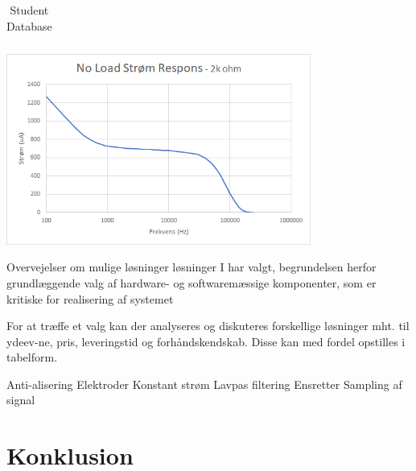 \documentclass[main.tex]{subfiles}
\begin{document}
\begin{table}[H]
\begin{minipage}[b]{0.30\linewidth}
\begin{tabular}{ r |  r }
\end{tabular}
    \caption{Student Database}
    \label{table:student}
\end{minipage}\hfill
\begin{minipage}[b]{0.7\linewidth}
\centering
\includegraphics[width=10cm]{Figure/stromfrekvensoprindelig2k}
\label{fig:image}
\end{minipage}
\end{table}














Overvejelser om mulige løsninger
løsninger I har valgt, begrundelsen herfor
grundlæggende valg af hardware- og softwaremæssige komponenter, som er kritiske for realisering af systemet

For at træffe et valg kan der analyseres og diskuteres forskellige løsninger mht. til ydeev-ne, pris, leveringstid og forhåndskendskab. Disse kan med fordel opstilles i tabelform.

Anti-alisering
Elektroder
Konstant strøm
Lavpas filtering
Ensretter
Sampling af signal






\chapter{Konklusion}


\end{document}
